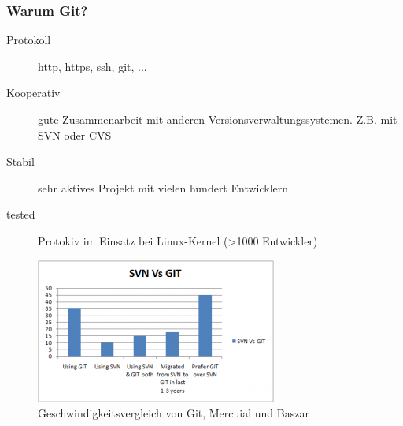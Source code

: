 \documentclass{beamer}
\begin{document}
\begin{frame}\frametitle{Warum Git?}
\begin{description}
\item[Protokoll] http, https, ssh, git, ...
\item[Kooperativ] gute Zusammenarbeit mit anderen Versionsverwaltungssystemen. Z.B. mit SVN oder CVS
\item[Stabil] sehr aktives Projekt mit vielen hundert Entwicklern
\item[tested] Protokiv im Einsatz bei Linux-Kernel (>1000 Entwickler)
\end{description}

\begin{figure}
\includegraphics[scale=0.5]{Bilder/svnvsgit1} 
\caption{Geschwindigkeitsvergleich von Git, Mercuial und Baszar}
\end{figure}
\end{frame}
\end{document}
